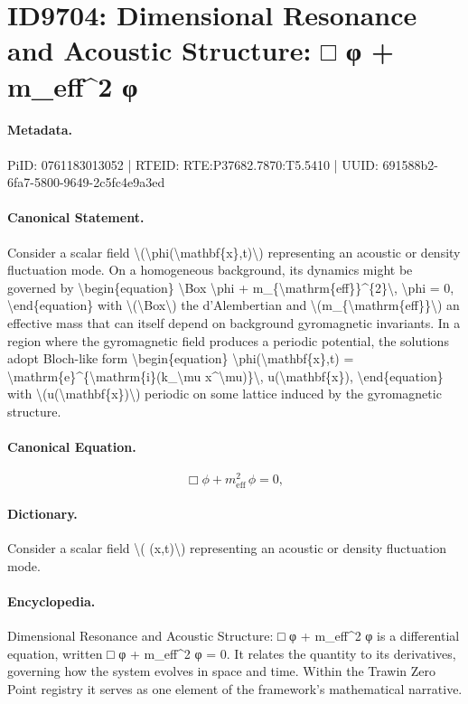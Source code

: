 \section*{ID9704: Dimensional Resonance and Acoustic Structure: □ φ + m\_eff\textasciicircum{}2 φ}
\paragraph{Metadata.}
PiID: 0761183013052 | RTEID: RTE:P37682.7870:T5.5410 | UUID: 691588b2-6fa7-5800-9649-2c5fc4e9a3ed

\paragraph{Canonical Statement.}
Consider a scalar field \textbackslash{}(\textbackslash{}phi(\textbackslash{}mathbf\{x\},t)\textbackslash{}) representing an acoustic or density fluctuation mode. On a homogeneous background, its dynamics might be governed by \textbackslash{}begin\{equation\} \textbackslash{}Box \textbackslash{}phi + m\_\{\textbackslash{}mathrm\{eff\}\}\textasciicircum{}\{2\}\textbackslash{}, \textbackslash{}phi = 0, \textbackslash{}end\{equation\} with \textbackslash{}(\textbackslash{}Box\textbackslash{}) the d'Alembertian and \textbackslash{}(m\_\{\textbackslash{}mathrm\{eff\}\}\textbackslash{}) an effective mass that can itself depend on background gyromagnetic invariants. In a region where the gyromagnetic field produces a periodic potential, the solutions adopt Bloch-like form \textbackslash{}begin\{equation\} \textbackslash{}phi(\textbackslash{}mathbf\{x\},t) = \textbackslash{}mathrm\{e\}\textasciicircum{}\{\textbackslash{}mathrm\{i\}(k\_\textbackslash{}mu x\textasciicircum{}\textbackslash{}mu)\}\textbackslash{}, u(\textbackslash{}mathbf\{x\}), \textbackslash{}end\{equation\} with \textbackslash{}(u(\textbackslash{}mathbf\{x\})\textbackslash{}) periodic on some lattice induced by the gyromagnetic structure.

\paragraph{Canonical Equation.}
\[
\Box \phi + m_{\mathrm{eff}}^{2}\, \phi = 0,
\]

\paragraph{Dictionary.}
Consider a scalar field \textbackslash{}( (x,t)\textbackslash{}) representing an acoustic or density fluctuation mode.

\paragraph{Encyclopedia.}
Dimensional Resonance and Acoustic Structure: □ φ + m\_eff\textasciicircum{}2 φ is a differential equation, written □ φ + m\_eff\textasciicircum{}2 φ = 0. It relates the quantity to its derivatives, governing how the system evolves in space and time. Within the Trawin Zero Point registry it serves as one element of the framework's mathematical narrative.
